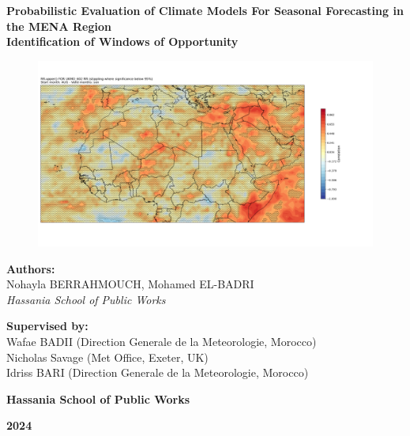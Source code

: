 \begin{titlepage}
    \centering



%



    \Huge
   \textbf{Probabilistic Evaluation of Climate Models For Seasonal Forecasting in the MENA Region} \\

    \vspace{0.5cm}
    \Large
    \textbf{Identification of Windows of Opportunity}

    \vspace{0.5cm}
    
    \begin{figure}[H]
    \centering
    \includegraphics[scale=0.3]{titlepage.png} 
    \end{figure}

    \Large
    \textbf{Authors:} \\
    Nohayla BERRAHMOUCH, Mohamed EL-BADRI \\
    \textit{Hassania School of Public Works}

    \vspace{0.5cm}
    \textbf{Supervised by:} \\
    Wafae BADII (Direction Generale de la Meteorologie, Morocco)\\ Nicholas Savage (Met Office, Exeter, UK) \\ Idriss BARI (Direction Generale de la Meteorologie, Morocco)

    \Large
    \textbf{Hassania School of Public Works}

    \vspace{0.8cm}

    \Large
    \textbf{2024}

    \vspace{0.31cm}

    
\end{titlepage}
